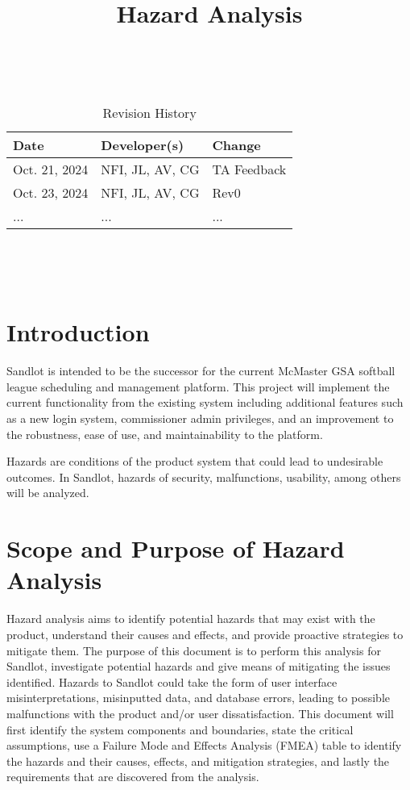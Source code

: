 \documentclass{article}
\title{Hazard Analysis\\\progname}
\author{\authname}
\date{}
\begin{document}
\maketitle
\thispagestyle{empty}

~\newpage


\begin{table}[hp]
\caption{Revision History} \label{TblRevisionHistory}
\begin{tabularx}{\textwidth}{llX}
\toprule
\textbf{Date} & \textbf{Developer(s)} & \textbf{Change}\\
\midrule
Oct. 21, 2024 & NFI, JL, AV, CG & TA Feedback\\
Oct. 23, 2024 & NFI, JL, AV, CG & Rev0\\
... & ... & ...\\
\bottomrule
\end{tabularx}
\end{table}

~\newpage

\tableofcontents

~\newpage


\section{Introduction}

Sandlot is intended to be the successor for the current McMaster GSA
softball league scheduling and management platform. This project
will implement the current functionality from the existing system including
additional features such as a new login system, commissioner admin
privileges, and an improvement to the robustness, ease of use, and
maintainability to the platform.

Hazards are conditions of the product system that could lead to undesirable outcomes. 
In Sandlot, hazards of security, malfunctions, usability, among others will be analyzed.

\section{Scope and Purpose of Hazard Analysis}

Hazard analysis aims to identify potential hazards that may exist with the product, 
understand their causes and effects, and provide proactive strategies to mitigate
them.
The purpose of this document is to perform this analysis for Sandlot, investigate potential
hazards and give means of mitigating the issues identified. 
Hazards to Sandlot could take the form of user interface misinterpretations, misinputted data,
and database errors, leading to possible malfunctions with the product and/or user 
dissatisfaction.
This document will first identify the system components and boundaries, state the critical
assumptions, use a Failure Mode and Effects Analysis (FMEA) table to identify the hazards
and their causes, effects, and mitigation strategies, and lastly the requirements that
are discovered from the analysis.
\end{document}
